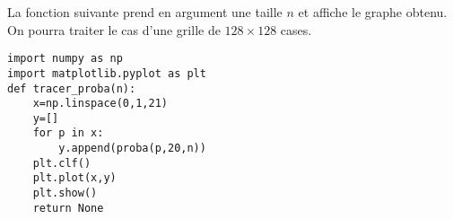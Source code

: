 La fonction suivante prend en argument une taille $n$ et affiche le graphe obtenu. On pourra traiter le 
cas d'une grille de $128\times 128$ cases.%

\begin{lstlisting}
import numpy as np
import matplotlib.pyplot as plt
def tracer_proba(n):
    x=np.linspace(0,1,21)
    y=[]
    for p in x:
        y.append(proba(p,20,n))
    plt.clf()
    plt.plot(x,y)
    plt.show()
    return None
\end{lstlisting}

%
%
%
%
%
%
%
%
%
%
%
